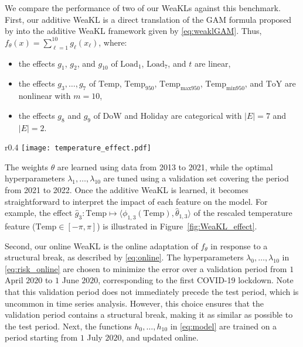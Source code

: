 We compare the performance of two of our WeaKLs against this benchmark.
First, our additive WeaKL is a direct translation of the GAM formula proposed by  \cite{obst2021adaptive} into the additive WeaKL framework given by \eqref{eq:weaklGAM}. Thus, $f_\theta(x) = \sum_{\ell=1}^{10} g_\ell(x_\ell)$, where:
\begin{itemize}
    \item the effects $g_1$, $g_2$, and $g_{10}$ of $\mathrm{Load}_1$, $\mathrm{Load}_7$, and $t$ are linear,
    \item the effects $g_3,\dots, g_7$ of $\mathrm{Temp}$, $\mathrm{Temp}_{950}$,  $\mathrm{Temp}_{\mathrm{max 950}}$, $ \mathrm{Temp}_{\mathrm{min 950}}$, and $\mathrm{ToY}$ are nonlinear with $m=10$,
    \item the effects $g_8$ and $g_9$ of   $\mathrm{DoW}$ and $\mathrm{Holiday}$ are categorical with $|E| = 7$ and $|E| = 2$.
\end{itemize}


\begin{wrapfigure}[\lenghtfig]{r}{0.4\textwidth}
    \centering 
    \vspace{-1em}
    \texttt{[image: temperature\_effect.pdf]}
    \vspace{-2em}
    \caption{Effect in MW of the temperature in the additive WeaKL.}
    \label{fig:WeaKL_effect}
 \end{wrapfigure}
\noindent The weights $\theta$ are learned using data from 2013 to 2021, while the optimal hyperparameters $\lambda_1, \dots, \lambda_{10}$ are tuned using a validation set covering the period from 2021 to 2022.
Once the additive WeaKL is learned, it becomes straightforward to interpret the impact of each feature on the model. For example, the effect $\hat g_3: \mathrm{Temp} \mapsto \langle\phi_{1,3}(\mathrm{Temp}), \hat \theta_{1, 3}\rangle $ of the rescaled temperature feature ($\mathrm{Temp} \in [-\pi, \pi]$) is illustrated in Figure~\ref{fig:WeaKL_effect}.


Second, our online WeaKL is the online adaptation of $f_\theta$  in response to a structural break, as described by \eqref{eq:online}.
The hyperparameters $\lambda_0, \dots, \lambda_{10}$ in \eqref{eq:risk_online} are chosen to minimize the error over a validation period from $1$ April $2020$ to $1$ June $2020$, corresponding to the first COVID-19 lockdown. Note that this validation period does not immediately precede the test period, which is uncommon in time series analysis. However, this choice ensures that the validation period contains a structural break, making it as similar as possible to the test period. Next, the functions $h_0, \dots, h_{10}$ in \eqref{eq:model} are trained on a period starting from $1$ July $2020$, and updated online. 

